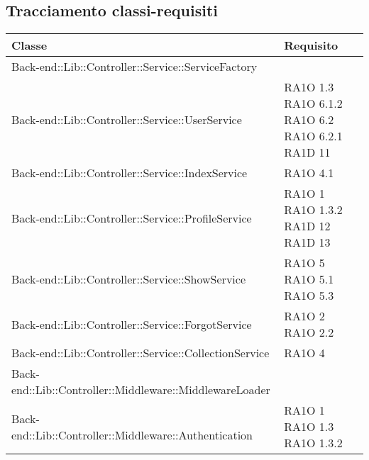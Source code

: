 \subsection{Tracciamento classi-requisiti}

\begin{center}
      \bgroup
      \def\arraystretch{1.8}
      \begin{longtable}{ | p{11cm} | p{3cm} | }
    \hline
    
      \cellcolor[gray]{0.9} \textbf{Classe} & \cellcolor[gray]{0.9} \textbf{Requisito} \\ \hline
    Back-end::Lib::Controller::Service::ServiceFactory & \\ \hline
	Back-end::Lib::Controller::Service::UserService & RA1O 1.3 \newline RA1O 6.1.2 \newline RA1O 6.2 \newline RA1O 6.2.1  \newline 
	RA1D 11  \\ \hline
	
	Back-end::Lib::Controller::Service::IndexService & RA1O 4.1 \\ \hline
	
	Back-end::Lib::Controller::Service::ProfileService & RA1O 1 \newline RA1O 1.3.2  \newline RA1D 12 \newline RA1D 13 \\ \hline

	Back-end::Lib::Controller::Service::ShowService & RA1O 5 \newline RA1O 5.1 \newline RA1O 5.3 \\ \hline
	
	Back-end::Lib::Controller::Service::ForgotService & RA1O 2 \newline RA1O 2.2 \\ \hline
	
	Back-end::Lib::Controller::Service::CollectionService & RA1O 4 \\ \hline
	
	Back-end::Lib::Controller::Middleware::MiddlewareLoader & \\ \hline

	Back-end::Lib::Controller::Middleware::Authentication & RA1O 1 \newline RA1O 1.3 \newline RA1O 1.3.2 \\ \hline
	

\end{longtable}
\end{center}
